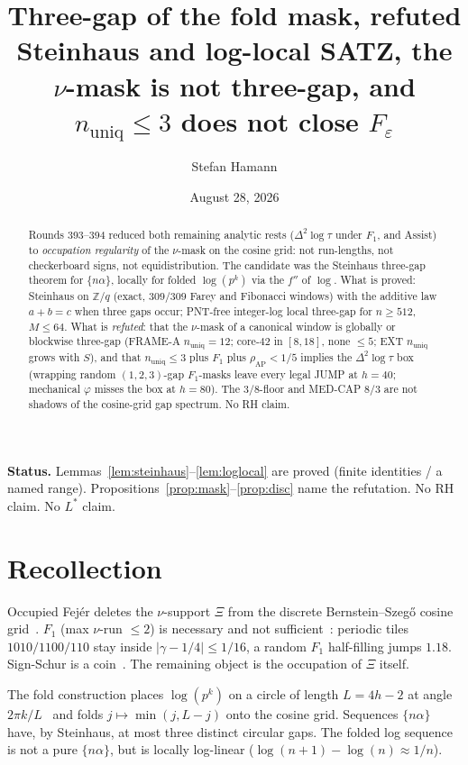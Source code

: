 \documentclass[11pt]{article}
\title{\bfseries Three-gap of the fold mask, refuted\\[2mm]
\large Steinhaus and log-local SATZ, the $\nu$-mask is not
three-gap, and $n_{\mathrm{uniq}}\le 3$ does not close $F_\varepsilon$}
\author{Stefan Hamann}
\date{August 28, 2026}
\theoremstyle{remark}
\newcommand{\Z}{\mathbb{Z}}
\begin{document}
\maketitle

\begin{abstract}\noindent
Rounds 393--394 reduced both remaining analytic rests
($\Delta^2\log\tau$ under $F_1$, and Assist) to
\emph{occupation regularity} of the $\nu$-mask on the cosine
grid: not run-lengths, not checkerboard signs, not
equidistribution.  The candidate was the Steinhaus three-gap
theorem for $\{n\alpha\}$, locally for folded $\log(p^k)$ via
the $f''$ of $\log$.
What is proved: Steinhaus on $\Z/q$ (exact, $309/309$ Farey and
Fibonacci windows) with the additive law $a+b=c$ when three
gaps occur; PNT-free integer-log local three-gap for
$n\ge 512$, $M\le 64$.  What is \emph{refuted}: that the
$\nu$-mask of a canonical window is globally or blockwise
three-gap (FRAME-A $n_{\mathrm{uniq}}=12$; core-$42$ in
$[8,18]$, none $\le 5$; EXT $n_{\mathrm{uniq}}$ grows with
$S$), and that $n_{\mathrm{uniq}}\le 3$ plus $F_1$ plus
$\rho_{\mathrm{AP}}<1/5$ implies the $\Delta^2\log\tau$ box
(wrapping random $(1,2,3)$-gap $F_1$-masks leave every legal
JUMP at $h=40$; mechanical $\varphi$ misses the box at
$h=80$).  The $3/8$-floor and MED-CAP $8/3$ are not shadows of
the cosine-grid gap spectrum.  No RH claim.
\end{abstract}

\medskip\noindent
\textbf{Status.}\enspace
Lemmas~\ref{lem:steinhaus}--\ref{lem:loglocal} are proved
(finite identities / a named range).
Propositions~\ref{prop:mask}--\ref{prop:disc} name the
refutation.  No RH claim.  No $L^*$ claim.

\section{Recollection}\label{sec:rec}

Occupied Fej\'er deletes the $\nu$-support $\Xi$ from the
discrete Bernstein--Szeg\H{o} cosine grid~\cite{r393,r390}.
$F_1$ (max $\nu$-run $\le 2$) is necessary and not
sufficient~\cite{r393}: periodic tiles $1010/1100/110$ stay
inside $\lvert\gamma-1/4\rvert\le 1/16$, a random $F_1$
half-filling jumps $1.18$.  Sign-Schur is a
coin~\cite{r394}.  The remaining object is the occupation of
$\Xi$ itself.

The fold construction places $\log(p^k)$ on a circle of length
$L=4h-2$ at angle $2\pi k/L$~\cite{r379} and folds
$j\mapsto\min(j,L-j)$ onto the cosine grid.  Sequences
$\{n\alpha\}$ have, by Steinhaus, at most three distinct
circular gaps.  The folded log sequence is not a pure
$\{n\alpha\}$, but is locally log-linear
($\log(n+1)-\log(n)\approx 1/n$).
\end{document}
